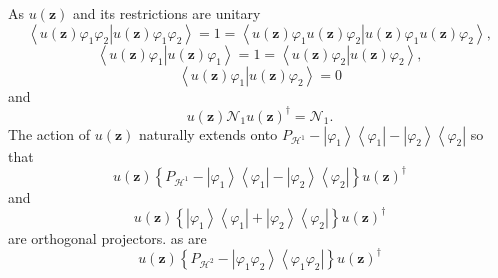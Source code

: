\documentclass[aps,preprint]{revtex4}%
\begin{document}
As $u\left(  \mathbf{z}\right)  $ and its restrictions are unitary
\begin{equation}
\left\langle \left.  u\left(  \mathbf{z}\right)  \varphi_{1}\varphi
_{2}\right\vert u\left(  \mathbf{z}\right)  \varphi_{1}\varphi_{2}%
\right\rangle =1=\left\langle \left.  u\left(  \mathbf{z}\right)  \varphi
_{1}u\left(  \mathbf{z}\right)  \varphi_{2}\right\vert u\left(  \mathbf{z}%
\right)  \varphi_{1}u\left(  \mathbf{z}\right)  \varphi_{2}\right\rangle ,
\end{equation}%
\begin{equation}
\left\langle \left.  u\left(  \mathbf{z}\right)  \varphi_{1}\right\vert
u\left(  \mathbf{z}\right)  \varphi_{1}\right\rangle =1=\left\langle \left.
u\left(  \mathbf{z}\right)  \varphi_{2}\right\vert u\left(  \mathbf{z}\right)
\varphi_{2}\right\rangle ,
\end{equation}%
\begin{equation}
\left\langle \left.  u\left(  \mathbf{z}\right)  \varphi_{1}\right\vert
u\left(  \mathbf{z}\right)  \varphi_{2}\right\rangle =0
\end{equation}
and%
\begin{equation}
u\left(  \mathbf{z}\right)  \mathcal{N}_{1}u\left(  \mathbf{z}\right)
^{\dagger}=\mathcal{N}_{1}.
\end{equation}
The action of $u\left(  \mathbf{z}\right)  $ naturally extends onto
$P_{\mathcal{H}^{1}}-\left\vert \varphi_{1}\right\rangle \left\langle
\varphi_{1}\right\vert -\left\vert \varphi_{2}\right\rangle \left\langle
\varphi_{2}\right\vert $ so that
\begin{equation}
u\left(  \mathbf{z}\right)  \left\{  P_{\mathcal{H}^{1}}-\left\vert
\varphi_{1}\right\rangle \left\langle \varphi_{1}\right\vert -\left\vert
\varphi_{2}\right\rangle \left\langle \varphi_{2}\right\vert \right\}
u\left(  \mathbf{z}\right)  ^{\dagger}%
\end{equation}
and
\begin{equation}
u\left(  \mathbf{z}\right)  \left\{  \left\vert \varphi_{1}\right\rangle
\left\langle \varphi_{1}\right\vert +\left\vert \varphi_{2}\right\rangle
\left\langle \varphi_{2}\right\vert \right\}  u\left(  \mathbf{z}\right)
^{\dagger}%
\end{equation}
are orthogonal projectors. as are
\begin{equation}
u\left(  \mathbf{z}\right)  \left\{  P_{\mathcal{H}^{2}}-\left\vert
\varphi_{1}\varphi_{2}\right\rangle \left\langle \varphi_{1}\varphi
_{2}\right\vert \right\}  u\left(  \mathbf{z}\right)  ^{\dagger}%
\end{equation}
\end{document}
